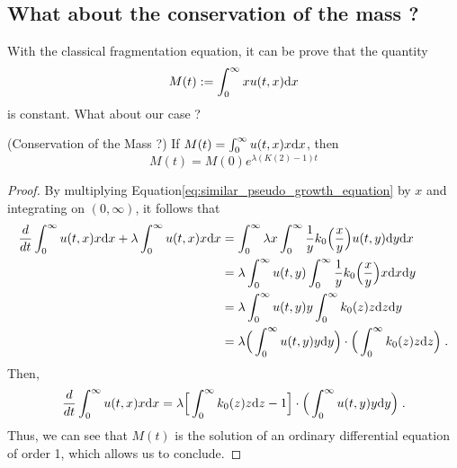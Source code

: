\documentclass[11pt]{amsart}
\begin{document}

\subsection{What about the conservation of the mass ?}
With the classical fragmentation equation, it can be prove that the quantity
    \begin{equation*}
        M(t) := \int_0^\infty x u(t, x) \mathrm dx
    \end{equation*}
is constant. What about our case ?

\begin{proposition}(Conservation of the Mass ?) If $M(t) = \int_0^\infty u(t,x) x \mathrm dx$, then 
    \begin{equation*}
        M(t) = M(0) e^{\lambda(K(2) - 1) t}
    \end{equation*}
\end{proposition}
\begin{proof}
By multiplying Equation\eqref{eq:similar_pseudo_growth_equation} by $x$ and integrating on $(0, \infty)$, it follows that
    \begin{align*}
        \frac{d}{d t} \int_0^\infty u(t,x) x \mathrm dx
        +
        \lambda \int_0^\infty u(t,x) x \mathrm dx
        &=
        \int_0^\infty \lambda x \int_{0}^{\infty} \frac{1}{y} k_0 \Big(\frac{x}{y} \Big) u(t,y) \mathrm dy \mathrm dx \\
	       &= 
	       \lambda \int_0^\infty  u(t,y) \int_{0}^{\infty} \frac{1}{y} k_0 \Big(\frac{x}{y} \Big) x\mathrm dx \mathrm dy 	   \\
	       &= 
	       \lambda \int_0^\infty  u(t,y) y  \int_{0}^{\infty} k_0(z) z \mathrm dz \mathrm dy	   \\
	       &= \lambda \Big( \int_0^\infty  u(t,y) y\mathrm dy \Big) \cdot \Big( \int_{0}^{\infty} k_0(z) z \mathrm dz \Big) 
	       \; .
    \end{align*}
Then, 
    \begin{equation}
        \frac{d}{d t} \int_0^\infty u(t,x) x \mathrm dx =  \lambda \Big[ \int_{0}^{\infty} k_0(z) z \mathrm dz - 1 \Big] \cdot \Big( \int_0^\infty  u(t,y) y\mathrm dy \Big)
	       \; .
    \end{equation}
Thus, we can see that $M(t)$ is the solution of an ordinary differential equation of order 1, which allows us to conclude.
\end{proof}
\end{document}
